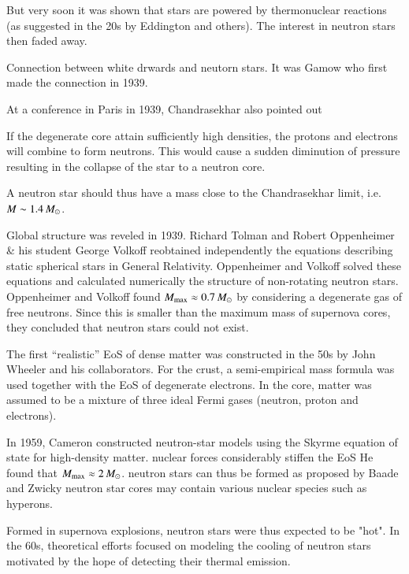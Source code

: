 But very soon it was shown that stars are powered by thermonuclear reactions (as suggested in the 20s by Eddington and others). 
The interest in neutron stars then faded away.

Connection between white drwards and neutorn stars.
It was Gamow who first made the connection in 1939. \cite{Gamow39}

At a conference in Paris in 1939, Chandrasekhar also pointed out
\begin{displayquote}
If the degenerate core attain sufficiently high densities, the protons and electrons will combine to form neutrons. 
This would cause a sudden diminution of pressure resulting in the collapse of the star to a neutron core.
\end{displayquote}
A neutron star should thus have a mass close to the Chandrasekhar limit, i.e. $M \sim 1.4\, M_{\odot}$.



Global structure was reveled in 1939.
Richard Tolman \cite{Tolman39}
and Robert Oppenheimer \& his student George Volkoff \cite{OV39}
reobtained independently the equations describing static spherical stars in General Relativity.
Oppenheimer and Volkoff solved these equations and calculated numerically the structure of non-rotating neutron stars.
Oppenheimer and Volkoff found $M_{\mathrm{max}} \approx 0.7\, M_{\odot}$ by considering a degenerate gas of free neutrons.
Since this is smaller than the maximum mass of supernova cores, they concluded that neutron stars could not exist.

The first “realistic” EoS of dense matter was constructed in the 50s by John Wheeler and his collaborators.\cite{Wheeler66}
For the crust, a semi-empirical mass formula was used together with the EoS of degenerate electrons. 
In the core, matter was assumed to be a mixture of three ideal Fermi gases (neutron, proton and electrons).


In 1959, Cameron constructed neutron-star models using the Skyrme equation of state for high-density matter. 
nuclear forces considerably stiffen the EoS
He found that $M_{\mathrm{max}} \approx 2\, M_{\odot}$.
neutron stars can thus be formed as proposed by Baade and Zwicky
neutron star cores may contain various nuclear species such as hyperons.

Formed in supernova explosions, neutron stars were thus expected to be "hot". 
In the 60s, theoretical efforts focused on modeling the cooling of neutron stars motivated by the hope of detecting their thermal emission.

